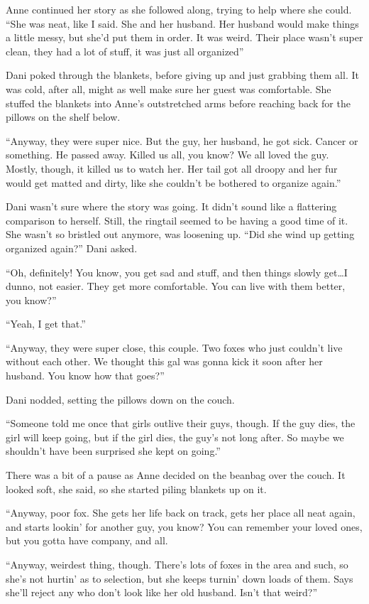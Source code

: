 Anne continued her story as she followed along, trying to help where she could. ``She was neat, like I said. She and her husband. Her husband would make things a little messy, but she'd put them in order. It was weird. Their place wasn't super clean, they had a lot of stuff, it was just all organized''

Dani poked through the blankets, before giving up and just grabbing them all. It was cold, after all, might as well make sure her guest was comfortable. She stuffed the blankets into Anne's outstretched arms before reaching back for the pillows on the shelf below.

``Anyway, they were super nice. But the guy, her husband, he got sick. Cancer or something. He passed away. Killed us all, you know? We all loved the guy. Mostly, though, it killed us to watch her. Her tail got all droopy and her fur would get matted and dirty, like she couldn't be bothered to organize again.''

Dani wasn't sure where the story was going. It didn't sound like a flattering comparison to herself. Still, the ringtail seemed to be having a good time of it. She wasn't so bristled out anymore, was loosening up. ``Did she wind up getting organized again?'' Dani asked.

``Oh, definitely! You know, you get sad and stuff, and then things slowly get\ldots{}I dunno, not easier. They get more comfortable. You can live with them better, you know?''

``Yeah, I get that.''

``Anyway, they were super close, this couple. Two foxes who just couldn't live without each other. We thought this gal was gonna kick it soon after her husband. You know how that goes?''

Dani nodded, setting the pillows down on the couch.

``Someone told me once that girls outlive their guys, though. If the guy dies, the girl will keep going, but if the girl dies, the guy's not long after. So maybe we shouldn't have been surprised she kept on going.''

There was a bit of a pause as Anne decided on the beanbag over the couch. It looked soft, she said, so she started piling blankets up on it.

``Anyway, poor fox. She gets her life back on track, gets her place all neat again, and starts lookin' for another guy, you know? You can remember your loved ones, but you gotta have company, and all.

``Anyway, weirdest thing, though. There's lots of foxes in the area and such, so she's not hurtin' as to selection, but she keeps turnin' down loads of them. Says she'll reject any who don't look like her old husband. Isn't that weird?''

